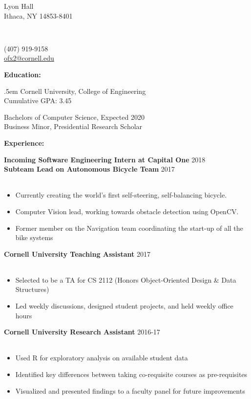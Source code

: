 \documentclass[12pt]{article}
\makeatletter
\newcommand{\name}{OLIVIA XIANG}
\newcommand{\addressPartOne}{402 Lyon Hall}
\newcommand{\addressPartTwo}{Ithaca, NY 14853-8401}
\newcommand{\phoneNumber}{(407) 919-9158}
\newcommand{\email}{ofx2@cornell.edu}
\newcommand{\gpa}{3.45}
\newcommand{\header}[5]{
	\begin{minipage}{0.3\linewidth} 
		\fontsize{12}{0} \selectfont
		#2\\[.25em]
		#3\\
		\vspace{1em} 
	\end{minipage}
	\vspace{-.75em}
	\begin{minipage}{0.4\linewidth} 
		\fontsize{16}{0} \selectfont
		\center{\textbf{#1}}\\
		\vspace{2em} 
	\end{minipage}
	\begin{minipage}{0.25\linewidth}
		\begin{flushright}
			\fontsize{12}{0} \selectfont
			#4\\[.25em]
			#5\\
			\vspace{1em} 
		\end{flushright}
	\end{minipage}
	\makebox[\linewidth]{\rule{100em}{.4pt}}
	\vspace{-.4em}
}
\newcommand{\captionSplitLeft}[7]{
	\makeCaption{#1}{#2}
	
	\splitLeft{#3}{#4}{#5}{#6}{#7}
}
\newcommand{\splitLeft}[5]{
	\begin{minipage}{#3\linewidth}
		\begin{adjustwidth}{#1}{}
			\fontsize{11}{12} \selectfont
			#2
		\end{adjustwidth}
	\end{minipage}
	\begin{minipage}{#5\linewidth}
		\begin{flushleft}
			\fontsize{11}{12} \selectfont 
			#4
		\end{flushleft}
	\end{minipage} 
	\vspace{1em}
}
\newcommand{\makeCaption}[2]{
	\fontsize{14}{0} \selectfont
	\textbf{#1:}
	\vspace{#2}
}
\newcommand{\group}[1]{
	\fontsize{14}{0} \selectfont
	\textbf{#1}
}
\newcommand{\jobCaption}[2]{
	\hspace{0.3em}
	\fontsize{12}{13} \selectfont
	\textbf{#1}
	\fontsize{11}{12} \selectfont 
	\hfill{#2}\\[.1em]
}
\makeatother
\begin{document}
	\header	{\name}
		{\addressPartOne}
		{\addressPartTwo}
		{\phoneNumber}
		{\href{mailto:\email}{\email}}



	\captionSplitLeft{Education}{.4em}{.5em}
		{Cornell University, College of Engineering\\
			Cumulative GPA: \gpa}{.5}
		{Bachelors of Computer Science, Expected 2020\\
			Business Minor, Presidential Research Scholar}{.5}
	\vspace{-.4em}

	\group{Experience:}
	\vspace{.4em}
	
	\jobCaption{Incoming Software Engineering Intern at Capital One}{2018}
	
	\jobCaption{Subteam Lead on Autonomous Bicycle Team}{2017}\\[-1.75em]
	\begin{itemize}[leftmargin=1.5cm]
	\setlength\itemsep{-.25em}
	\fontsize{11}{0} \selectfont
	
	\item Currently creating the world's first self-steering, self-balancing bicycle. 
	\item Computer Vision lead, working towards obstacle detection using OpenCV.
	\item Former member on the Navigation team coordinating the start-up of all the bike systems
	\end{itemize}
	\vspace{.7em}
	
	\jobCaption{Cornell University Teaching Assistant}{2017}\\[-1.75em]
	\begin{itemize}[leftmargin=1.5cm]
		\setlength\itemsep{-.25em}
		\fontsize{11}{0} \selectfont 
	
		\item Selected to be a TA for CS 2112 (Honors Object-Oriented Design \& Data Structures)
		\item Led weekly discussions, designed student projects, and held weekly office hours
	\end{itemize}
	\vspace{.7em}

	
	\jobCaption{Cornell University Research Assistant}{2016-17}\\[-1.75em]
	\begin{itemize}[leftmargin=1.5cm]
		\setlength\itemsep{-.25em}
		\fontsize{11}{0} \selectfont 
	\item Used R for exploratory analysis on available student data
	\item Identified key differences between taking co-requisite courses as pre-requisites

\item Visualized and presented findings to a faculty panel for future improvements
	
	\end{itemize}
	
\end{document}
